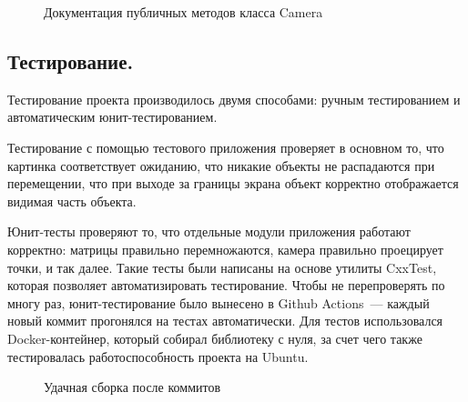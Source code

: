 \documentclass{article}
\begin{document}
\begin{center}
\begin{figure}[H]
\caption{Документация публичных методов класса Camera}
\label{ris:image}
\end{figure}
\end{center}

\subsection{Тестирование.}

Тестирование проекта производилось двумя способами: ручным тестированием и автоматическим юнит-тестированием.

Тестирование с помощью тестового приложения проверяет в основном то, что картинка соответствует ожиданию, что никакие объекты не распадаются при перемещении, что при выходе за границы экрана объект корректно отображается видимая часть объекта.

Юнит-тесты проверяют то, что отдельные модули приложения работают корректно: матрицы правильно перемножаются, камера правильно проецирует точки, и так далее. Такие тесты были написаны на основе утилиты CxxTest, которая позволяет автоматизировать тестирование. Чтобы не перепроверять по многу раз, юнит-тестирование было вынесено в Github Actions~--- каждый новый коммит прогонялся на тестах автоматически. Для тестов использовался Docker-контейнер, который собирал библиотеку с нуля, за счет чего также тестировалась работоспособность проекта на Ubuntu.

\begin{center}
\begin{figure}[H]
\caption{Удачная сборка после коммитов}
\label{ris:image}
\end{figure}
\end{center}
\newpage
\end{document}

